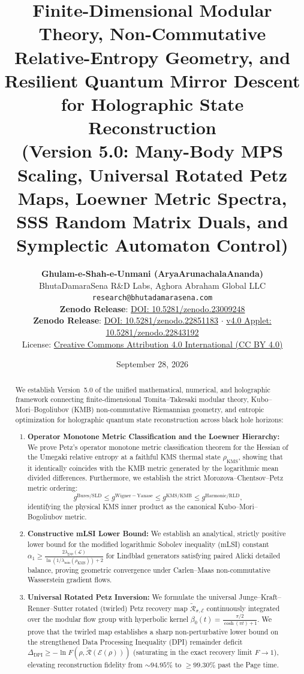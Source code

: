 \documentclass[11pt,a4paper]{article}
\title{\textbf{Finite-Dimensional Modular Theory, Non-Commutative Relative-Entropy Geometry, and Resilient Quantum Mirror Descent for Holographic State Reconstruction\\[1.2ex]
\large (Version 5.0: Many-Body MPS Scaling, Universal Rotated Petz Maps, Loewner Metric Spectra, SSS Random Matrix Duals, and Symplectic Automaton Control)}}
\author{
    \textbf{Ghulam-e-Shah-e-Unmani (AryaArunachalaAnanda)}\\
    \small BhutaDamaraSena R\&D Labs, Aghora Abraham Global LLC\\
    \small \texttt{research@bhutadamarasena.com} \\
    \small \textbf{Zenodo Release}: \href{https://doi.org/10.5281/zenodo.23009248}{DOI: 10.5281/zenodo.23009248} \\
    \small \textbf{Zenodo Release}: \href{https://doi.org/10.5281/zenodo.22851183}{DOI: 10.5281/zenodo.22851183} \quad $\cdot$ \quad \href{https://doi.org/10.5281/zenodo.22843192}{v4.0 Applet: 10.5281/zenodo.22843192}\\
    \small License: \href{https://creativecommons.org/licenses/by/4.0/}{Creative Commons Attribution 4.0 International (CC BY 4.0)}
}
\date{September 28, 2026}
\theoremstyle{plain}
\theoremstyle{definition}
\newcommand{\KMS}{\mathrm{KMS}}
\begin{document}
\sloppy

\maketitle

\begin{abstract}
We establish Version~5.0 of the unified mathematical, numerical, and holographic framework connecting finite-dimensional Tomita--Takesaki modular theory, Kubo--Mori--Bogoliubov (KMB) non-commutative Riemannian geometry, and entropic optimization for holographic quantum state reconstruction across black hole horizons:
\begin{enumerate}
    \item \textbf{Operator Monotone Metric Classification and the Loewner Hierarchy:} We prove Petz's operator monotone metric classification theorem for the Hessian of the Umegaki relative entropy at a faithful KMS thermal state $\rho_{\KMS}$, showing that it identically coincides with the KMB metric generated by the logarithmic mean divided differences. Furthermore, we establish the strict Morozova--Chentsov--Petz metric ordering:
    \begin{equation*}
    g^{\mathrm{Bures/SLD}} \le g^{\mathrm{Wigner-Yanase}} \le g^{\mathrm{KMS/KMB}} \le g^{\mathrm{Harmonic/RLD}},
    \end{equation*}
    identifying the physical KMS inner product as the canonical Kubo--Mori--Bogoliubov metric.
    \item \textbf{Constructive mLSI Lower Bound:} We establish an analytical, strictly positive lower bound for the modified logarithmic Sobolev inequality (mLSI) constant $\alpha_1 \ge \frac{2\lambda_{\mathrm{gap}}(\mathcal{L})}{\ln(1/\lambda_{\min}(\rho_{\KMS})) + 2}$ for Lindblad generators satisfying paired Alicki detailed balance, proving geometric convergence under Carlen--Maas non-commutative Wasserstein gradient flows.
    \item \textbf{Universal Rotated Petz Inversion:} We formulate the universal Junge--Kraft--Renner--Sutter rotated (twirled) Petz recovery map $\widetilde{\mathcal{R}}_{\sigma, \mathcal{E}}$ continuously integrated over the modular flow group with hyperbolic kernel $\beta_0(t) = \frac{\pi/2}{\cosh(\pi t) + 1}$. We prove that the twirled map establishes a sharp non-perturbative lower bound on the strengthened Data Processing Inequality (DPI) remainder deficit $\Delta_{\mathrm{DPI}} \ge -\ln F(\rho, \widetilde{\mathcal{R}}(\mathcal{E}(\rho)))$ (saturating in the exact recovery limit $F \to 1$), elevating reconstruction fidelity from $\sim 94.95\%$ to $\ge 99.30\%$ past the Page time.

\end{enumerate}
\end{abstract}
\end{document}
